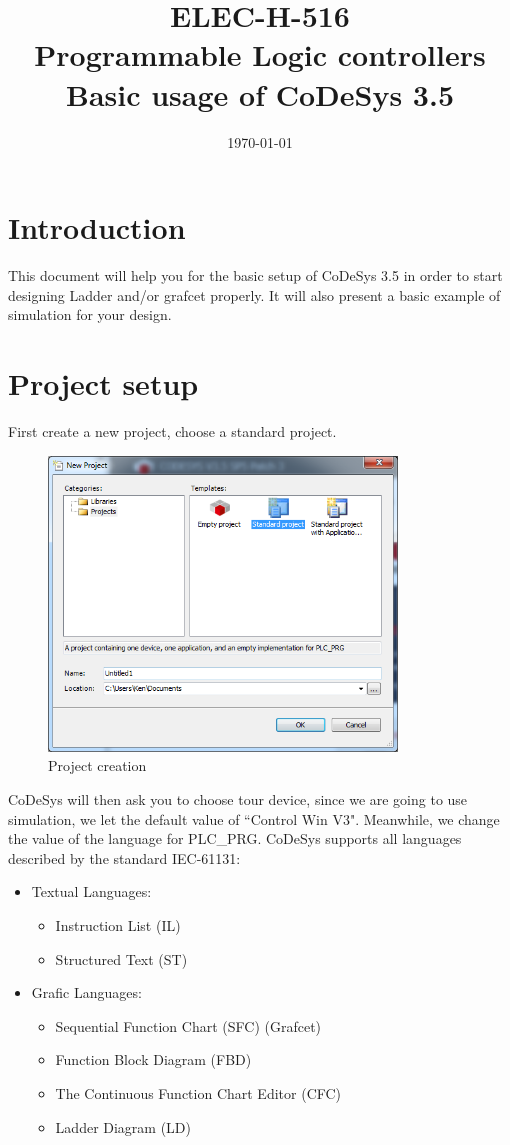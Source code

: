 \documentclass[10pt,a4paper]{article}
\date{\vspace{-1cm}\mydate\today}
\title{\vspace{-2cm} ELEC-H-516 \\ Programmable Logic controllers \\
                                Basic usage of CoDeSys 3.5}
\begin{document}
\maketitle

\section{Introduction}
This document will help you for the basic setup of CoDeSys 3.5 in order to start designing Ladder and/or grafcet properly. It will also present a basic example of simulation for your design.

\section{Project setup}
First create a new project, choose a standard project.

\begin{figure}[h!]
	\begin{center}
		\includegraphics[width=350px]{img2.PNG}
	\end{center}
\caption{Project creation}
\label{fig:creation}
\end{figure}

CoDeSys will then ask you to choose tour device, since we are going to use simulation, we let the default value of ``Control Win V3".
Meanwhile, we change the value of the language for PLC\_PRG.
CoDeSys supports all languages described by the standard IEC-61131:

\begin{itemize}
\item Textual Languages:
\begin{itemize}
\item Instruction List (IL)
\item Structured Text (ST)
\end{itemize}
\item Grafic Languages:
\begin{itemize}
\item Sequential Function Chart (SFC) (Grafcet)
\item Function Block Diagram (FBD)
\item The Continuous Function Chart Editor (CFC)
\item Ladder Diagram (LD)
\end{itemize}
\end{itemize}
\end{document}

